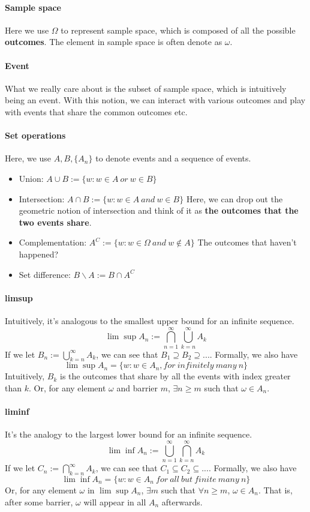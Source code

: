 \documentclass[../Probability_Theory.tex]{subfiles}
\begin{document}
\paragraph{Sample space}
Here we use $\Omega$ to represent sample space, which is composed of all the possible {\bf outcomes}. The element in sample space is often denote as $\omega$.
\paragraph{Event}
What we really care about is the subset of sample space, which is intuitively being an event. With this notion, we can interact with various outcomes and play with events that share the common outcomes etc.
\paragraph{Set operations} Here, we use $A,B,\{A_n\}$ to denote events and a sequence of events.
\begin{itemize}
	\item Union: $A\cup B := \{w:w\in A\ or\ w\in B \}$
	\item Intersection: $A\cap B := \{w:w\in A\ and\ w\in B \}$
	Here, we can drop out the geometric notion of intersection and think of it as {\bf the outcomes that the two events share}.
	\item Complementation: $A^C:=\{w:w\in\Omega\ and\ w\notin A \}$
	The outcomes that haven't happened?
	\item Set difference: $B\backslash A:= B\cap A^C$
\end{itemize}

\paragraph{limsup}
Intuitively, it's analogous to the smallest upper bound for an infinite sequence.
$$\lim\sup A_n := \bigcap_{n=1}^{\infty}\bigcup_{k=n}^{\infty} A_k$$
If we let $B_n:=\bigcup_{k=n}^{\infty} A_k$, we can see that $B_1\supseteq B_2\supseteq...$. Formally, we also have
$$\lim\sup A_n = \{w:w\in A_n, for\ infinitely\ many\ n \}$$
Intuitively, $B_k$ is the outcomes that share by all the events with index greater than $k$.
Or, for any element $\omega$ and barrier $m$, $\exists n\geq m$ such that $\omega\in A_n$.

\paragraph{liminf}
It's the analogy to the largest lower bound for an infinite sequence.
$$\lim\inf A_n:= \bigcup_{n=1}^{\infty}\bigcap_{k=n}^{\infty} A_k$$
If we let $C_n:= \bigcap_{k=n}^{\infty} A_k$, we can see that $C_1\subseteq C_2\subseteq...$. Formally, we also have
$$\lim\inf A_n=\{w:w\in A_n\ for\ all\ but\ finite\ many\ n \}$$
Or, for any element $\omega$ in $\lim\sup A_n$, $\exists m$ such that $\forall n\geq m$, $\omega\in A_n$. That is, after some barrier, $\omega$ will appear in all $A_n$ afterwards.
\end{document}
